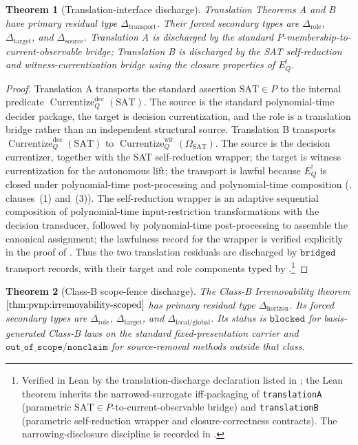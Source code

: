 \documentclass[11pt]{article}
\newcommand{\EQbang}{E^{!}_{Q}}
\newcommand{\OmegaSAT}{\Omega_{\mathrm{SAT}}}
\newcommand{\CurrentizeDec}{\operatorname{Currentize}^{\mathrm{dec}}_{Q}}
\newcommand{\CurrentizeWit}{\operatorname{Currentize}^{\mathrm{wit}}_{Q}}
\newtheorem{theorem}{Theorem}[section]
\theoremstyle{definition}
\begin{document}
\begin{theorem}[Translation-interface discharge]
\label{thm:pvnp:aor:translation-discharge}
Translation Theorems A and B have primary residual type
\(\Delta_{\mathrm{transport}}\).  Their forced secondary types are
\(\Delta_{\mathrm{role}}\), \(\Delta_{\mathrm{target}}\), and
\(\Delta_{\mathrm{source}}\).  Translation A is discharged by the
standard \(P\)-membership-to-current-observable bridge; Translation B
is discharged by the SAT self-reduction and witness-currentization
bridge using the closure properties of \(\EQbang\).
\end{theorem}

\begin{proof}
Translation A transports the standard assertion \(\mathrm{SAT}\in P\)
to the internal predicate \(\CurrentizeDec(\mathrm{SAT})\).  The
source is the standard polynomial-time decider package, the target is
decision currentization, and the role is a translation bridge rather
than an independent structural source.  Translation B transports
\(\CurrentizeDec(\mathrm{SAT})\) to
\(\CurrentizeWit(\OmegaSAT)\).  The source is the decision
currentizer, together with the SAT self-reduction wrapper; the target
is witness currentization for the autonomous lift; the transport is
lawful because \(\EQbang\) is closed under polynomial-time
post-processing and polynomial-time composition
(, clauses~(1) and~(3)).  The
self-reduction wrapper is an adaptive sequential composition of
polynomial-time input-restriction transformations with the decision
transducer, followed by polynomial-time post-processing to assemble
the canonical assignment; the lawfulness record for the wrapper is
verified explicitly in the proof of .  Thus the
two translation residuals are discharged by \(\texttt{bridged}\)
transport records, with their target and role components typed by
.\footnote{Verified
in Lean by the translation-discharge declaration listed in
; the Lean theorem inherits the
narrowed-surrogate iff-packaging of
\texttt{translationA} (parametric
\(\mathrm{SAT}\in P\)-to-current-observable bridge) and
\texttt{translationB} (parametric
self-reduction wrapper and closure-correctness contracts).  The
narrowing-disclosure discipline is recorded in
.}
\end{proof}

\begin{theorem}[Class-B scope-fence discharge]
\label{thm:pvnp:aor:class-b-scope-fence}
The Class-B Irremovability theorem
\(\Cref{thm:pvnp:irremovability-scoped}\) has primary residual type
\(\Delta_{\mathrm{horizon}}\).  Its forced secondary types are
\(\Delta_{\mathrm{role}}\), \(\Delta_{\mathrm{target}}\), and
\(\Delta_{\mathrm{local/global}}\).  Its status is
\(\texttt{blocked}\) for basis-generated Class-B laws on the standard
fixed-presentation carrier and
\(\texttt{out\_of\_scope}/\texttt{nonclaim}\) for source-removal
methods outside that class.
\end{theorem}
\end{document}
